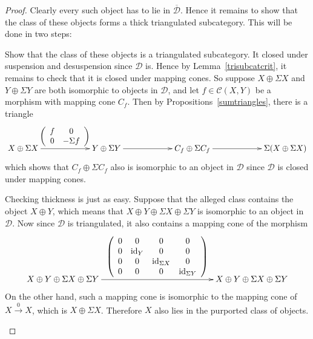 \documentclass{amsproc}
\theoremstyle{definition}
\begin{document}
\begin{proof}
Clearly every such object has to lie in $\overline{\mathcal{D}}$. Hence it remains to show that the class of these objects forms a thick triangulated subcategory. This will be done in two steps:
\begin{compactenum}
\item Show that the class of these objects is a triangulated subcategory. It closed under suspension and desuspension since ${\mathcal{D}}$ is. Hence by Lemma~\ref{trisubcatcrit}, it remains to check that it is closed under mapping cones. So suppose $X\oplus\Sigma X$ and $Y\oplus\Sigma Y$ are both isomorphic to objects in ${\mathcal{D}}$, and let $f\in{\mathcal{C}}(X,Y)$ be a morphism with mapping cone $C_f$. Then by Propositions~\ref{sumtriangles}, there is a triangle
\begin{displaymath}
\xymatrix@+3pc{X\oplus\Sigma X\ar[r]^{\left(\begin{array}{cc}f&0\\0&-\Sigma f\end{array}\right)} & Y\oplus\Sigma Y\ar[r] & C_f\oplus\Sigma C_f\ar[r] & \Sigma(X\oplus\Sigma X)}
\end{displaymath}
which shows that $C_f\oplus\Sigma C_f$ also is isomorphic to an object in ${\mathcal{D}}$ since ${\mathcal{D}}$ is closed under mapping cones.
\item Checking thickness is just as easy. Suppose that the alleged class contains the object $X\oplus Y$, which means that $X\oplus Y\oplus\Sigma X\oplus\Sigma Y$ is isomorphic to an object in ${\mathcal{D}}$. Now since ${\mathcal{D}}$ is triangulated, it also contains a mapping cone of the morphism
\begin{displaymath}
\xymatrix@+9pc{X\oplus Y\oplus\Sigma X\oplus\Sigma Y\ar[r]^{\left(\begin{array}{cccc}0&0&0&0\\0&{\mathrm{id}}_Y&0&0\\0&0&{\mathrm{id}}_{\Sigma X}&0\\0&0&0&{\mathrm{id}}_{\Sigma Y}\end{array}\right)} & X\oplus Y\oplus \Sigma X\oplus\Sigma Y}
\end{displaymath}
On the other hand, such a mapping cone is isomorphic to the mapping cone of $X\stackrel{0}{\longrightarrow} X$, which is $X\oplus\Sigma X$. Therefore $X$ also lies in the purported class of objects.\qedhere
\end{compactenum}
\end{proof}
\end{document}
